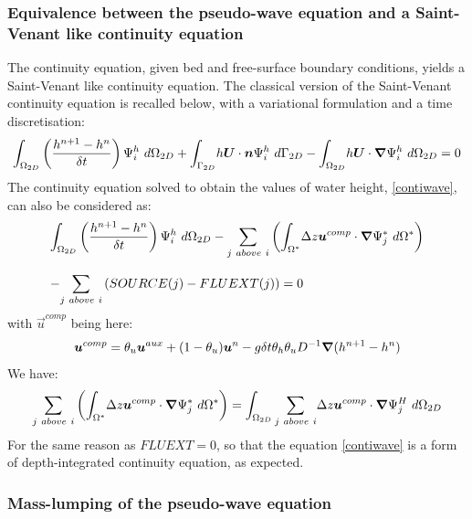 \subsubsection{Equivalence between the pseudo-wave equation and a Saint-Venant like continuity equation}
The continuity equation, given bed and free-surface boundary conditions,
yields a Saint-Venant like continuity equation. The classical version of the
Saint-Venant continuity equation is recalled below, with a variational formulation and a time discretisation:
\begin{equation}
\displaystyle{\int_{\Omega_{2D}}}\left(\dfrac{h^{n+1}-h^{n}}{\delta t}
\right)\Psi_{i}^{h}~d\Omega_{2D}
+\displaystyle{\int_{\Gamma_{2D}}}h\bm{U}\cdot\bm{n}\Psi_{i}^{h}~d\Gamma_{2D}
-\displaystyle{\int_{\Omega_{2D}}}h\bm{U}\cdot\bm{\nabla}\Psi_{i}^{h}~d\Omega_{2D}=0
\end{equation}
The continuity equation solved to obtain the values of water height,
\eqref{contiwave}, can also be considered as:%
\begin{equation}
\begin{array}{l}
\displaystyle{\int_{\Omega_{2D}}}\left(\dfrac{h^{n+1}-h^{n}}{\delta t}
\right)\Psi_{i}^{h}~d\Omega_{2D}-\displaystyle{\sum_{j~above~i}}\left(
\displaystyle{\int_{\Omega^{\ast}}}\Delta z\vec{u}^{comp}\cdot\Grad\Psi_{j}^{*}
~d\Omega^{\ast}\right)\bigskip\\
-\displaystyle{\sum_{j~above~i}}\left(  SOURCE(j)-FLUEXT(j)\right)  =0
\end{array}
\end{equation}
with $\vec{u}^{comp}$ being here:
\begin{equation}
\vec{u}^{comp}=\theta_u\vec{u}^{aux}+(1-\theta_u)\vec{u}^n-g\delta t\theta_{h}\theta_{u}D^{-1}\Grad(h^{n+1}-h^{n})%
\end{equation}
We have:
\begin{equation}
\displaystyle{\sum_{j~above~i}}\left(
\displaystyle{\int_{\Omega^{\ast}}}\Delta z\bm{u}^{comp}\cdot\bm{\nabla}\Psi_{j}^{*}
~d\Omega^{\ast}\right)=\int_{\Omega_{2D}}\displaystyle{\sum_{j~above~i}}\Delta z\bm{u}^{comp}\cdot\bm{\nabla}\Psi_j^H~d\Omega_{2D}
\end{equation}
For the same reason as $FLUEXT = 0$, so that the equation \eqref{contiwave}
is a form of depth-integrated continuity equation, as expected.

\subsubsection{Mass-lumping of the pseudo-wave equation}\label{sec:masslumping}

